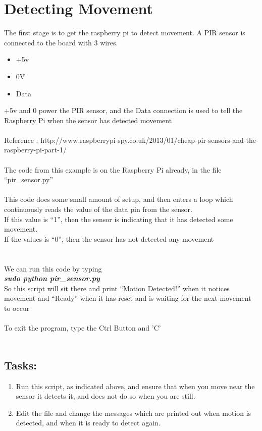 \documentclass[a4paper]{article}
\begin{document}
\newpage\section {Detecting Movement}
The first stage is to get the raspberry pi to detect movement. A PIR sensor is connected to the board with 3 wires.
\begin{itemize}
\item+5v
\item 0V
\item Data
\end{itemize}
+5v and 0 power the PIR sensor, and the Data connection is used to tell the Raspberry Pi when the sensor has detected movement
\\
\\
Reference : http://www.raspberrypi-spy.co.uk/2013/01/cheap-pir-sensors-and-the-raspberry-pi-part-1/
\\
\\
The code from this example is on the Raspberry Pi already, in the file ``pir\_sensor.py''
\\
\\
This code does some small amount of setup, and then enters a loop which continuously reads the value of the data pin from the sensor.\\
If this value is ``1'', then the sensor is indicating that it has detected some movement. \\
If the values is ``0'', then the sensor has not detected any movement \\
\\
\\
We can run this code by typing \\
\emph{\textbf{sudo python pir\_sensor.py}}
\\
So this script will sit there and print ``Motion Detected!'' when it notices movement and ``Ready'' when it has reset and is waiting for the next movement to occur
\\
\\
To exit the program, type the Ctrl Button and 'C'
\\
\\
\subsection{Tasks:}
\begin{enumerate}
\item Run this script, as indicated above, and ensure that when you move near the sensor it detects it, and does not do so when you are still.
\item Edit the file and change the messages which are printed out when motion is detected, and when it is ready to detect again.
\end {enumerate}
\end{document}

